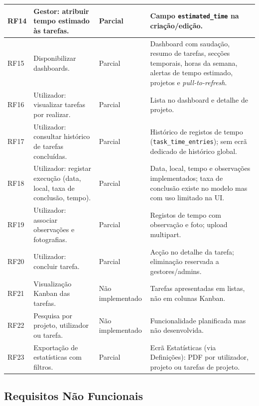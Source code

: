 \documentclass[12pt,a4paper]{article}
\begin{document}
\begin{longtable}{|p{1.2cm}|p{7.2cm}|p{2.2cm}|p{3.8cm}|}
\hline
RF14 & Gestor: atribuir tempo estimado às tarefas. & Parcial & Campo \texttt{estimated\_time} na criação/edição.\\
\hline
RF15 & Disponibilizar dashboards. & Parcial & Dashboard com saudação, resumo de tarefas, secções temporais, horas da semana, alertas de tempo estimado, projetos e \textit{pull-to-refresh}.\\
\hline
RF16 & Utilizador: visualizar tarefas por realizar. & Parcial & Lista no dashboard e detalhe de projeto.\\
\hline
RF17 & Utilizador: consultar histórico de tarefas concluídas. & Parcial & Histórico de registos de tempo (\texttt{task\_time\_entries}); sem ecrã dedicado de histórico global.\\
\hline
RF18 & Utilizador: registar execução (data, local, taxa de conclusão, tempo). & Parcial & Data, local, tempo e observações implementados; taxa de conclusão existe no modelo mas com uso limitado na UI.\\
\hline
RF19 & Utilizador: associar observações e fotografias. & Parcial & Registos de tempo com observação e foto; upload multipart.\\
\hline
RF20 & Utilizador: concluir tarefa. & Parcial & Acção no detalhe da tarefa; eliminação reservada a gestores/admins.\\
\hline
RF21 & Visualização Kanban das tarefas. & Não implementado & Tarefas apresentadas em listas, não em colunas Kanban.\\
\hline
RF22 & Pesquisa por projeto, utilizador ou tarefa. & Não implementado & Funcionalidade planificada mas não desenvolvida.\\
\hline
RF23 & Exportação de estatísticas com filtros. & Parcial & Ecrã Estatísticas (via Definições): PDF por utilizador, projeto ou tarefas de projeto.\\
\hline
\end{longtable}

\subsection{Requisitos Não Funcionais}
\end{document}
